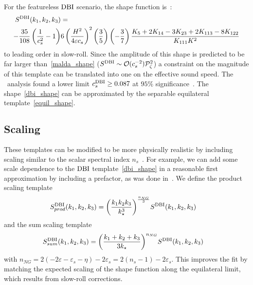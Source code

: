 For the featureless $\text{DBI}$ scenario, the shape function is~\cite{dbi_in_the_sky}:
\begin{align}\label{dbi_shape}
    S^{\text{DBI}}(k_1,k_2,k_3) &=\nonumber\\
    -\frac{35}{108}
         \left(\frac{1}{c_s^2}-1\right)&
         6\left(\frac{H^2}{4\varepsilon c_s}\right)^2
         \left(\frac{3}{5}\right)
         \left(-\frac{3}{7}\right)
         \frac{K_5+2K_{14}-3K_{23}+2K_{113}-8K_{122}}{K_{111}K^2}
\end{align}
to leading order in slow-roll.
Since the amplitude of this shape is predicted to be far larger than~\eqref{malda_shape}
($S^{\text{DBI}}\sim\mathcal{O}(c_s^{-2})\mathcal{P}^2_{\zeta}$)
a constraint on the magnitude of this template can be translated into one 
on the effective sound speed. The \planck~analysis found a lower limit $c_s^{\text{DBI}} \geq 0.087$
at $95\%$ significance~\cite{Planck_NG_2015}.
The shape~\eqref{dbi_shape} can be approximated by the separable equilateral template~\eqref{equil_shape}.


    \subsection{Scaling}
These templates can be modified to be more physically realistic by including
scaling similar to the scalar spectral index $n_s$~\cite{Planck_NG_2015}.
For example, we can add some scale dependence to the $\text{DBI}$ template~\eqref{dbi_shape}
in a reasonable first approximation by including a prefactor,
as was done in~\cite{Planck_NG_2013}.
We define the product scaling template
\begin{align}\label{dbi_prod_shape}
    S^{\text{DBI}}_{prod}(k_1,k_2,k_3) &= {\left(\frac{k_1k_2k_3}{k^3_\star}\right)}^{\frac{n_{NG}}{3}}S^{\text{DBI}}(k_1,k_2,k_3)
\end{align}
and the sum scaling template
\begin{align}\label{dbi_sum_shape}
    S^{\text{DBI}}_{sum}(k_1,k_2,k_3) &= {\left(\frac{k_1+k_2+k_3}{3k_\star}\right)}^{n_{NG}}S^{\text{DBI}}(k_1,k_2,k_3)
\end{align}
with $n_{NG}=2(-2\varepsilon-\varepsilon_s-\eta)-2\varepsilon_s=2(n_s-1)-2\varepsilon_s$.
This improves the fit by matching the expected scaling of the shape function
along the equilateral limit, which results from slow-roll corrections.


